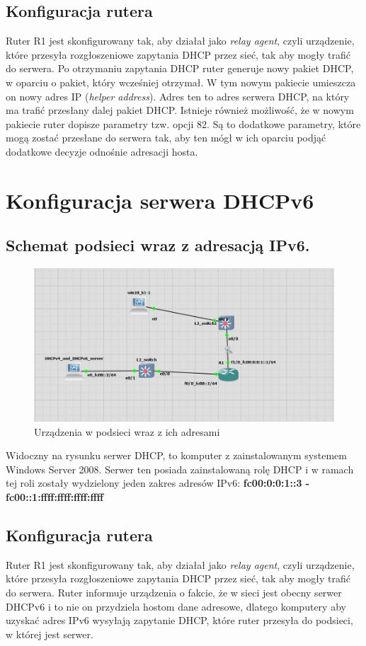 \documentclass[12pt, a4paper]{article}
\begin{document}
    \subsection{Konfiguracja rutera}
        Ruter R1 jest skonfigurowany tak, aby działał jako \textit{relay agent}, czyli urządzenie, które przesyła rozgłoszeniowe zapytania DHCP przez sieć, tak aby mogły trafić do serwera. Po otrzymaniu zapytania DHCP ruter generuje nowy pakiet DHCP, w oparciu o pakiet, który wcześniej otrzymał. W tym nowym pakiecie umieszcza on nowy adres IP (\textit{helper address}). Adres ten to adres serwera DHCP, na który ma trafić przesłany dalej pakiet DHCP. Istnieje również możliwość, że w nowym pakiecie ruter dopisze parametry tzw. opcji 82. Są to dodatkowe parametry, które mogą zostać przesłane do serwera tak, aby ten mógł w ich oparciu podjąć dodatkowe decyzje odnośnie adresacji hosta.
\section{Konfiguracja serwera DHCPv6}
    \subsection{Schemat podsieci wraz z adresacją IPv6.}
        \begin{figure}[!h]
            \centering
            \includegraphics[scale = 0.456]{podsiec_dhcpv6.JPG}
            \caption{Urządzenia w podsieci wraz z ich adresami}
            \label{fig:dhcpv6}
        \end{figure}
        Widoczny na rysunku serwer DHCP, to komputer z zainstalowanym systemem Windows Server 2008. Serwer ten posiada zainstalowaną rolę DHCP i w ramach tej roli zostały wydzielony jeden zakres adresów IPv6: \textbf{fc00:0:0:1::3 - fc00::1:ffff:ffff:ffff:ffff}
    \subsection{Konfiguracja rutera}
        Ruter R1 jest skonfigurowany tak, aby działał jako \textit{relay agent}, czyli urządzenie, które przesyła rozgłoszeniowe zapytania DHCP przez sieć, tak aby mogły trafić do serwera. Ruter informuje urządzenia o fakcie, że w sieci jest obecny serwer DHCPv6 i to nie on przydziela hostom dane adresowe, dlatego komputery aby uzyskać adres IPv6 wysyłają zapytanie DHCP, które ruter przesyła do podsieci, w której jest serwer.
\end{document}
